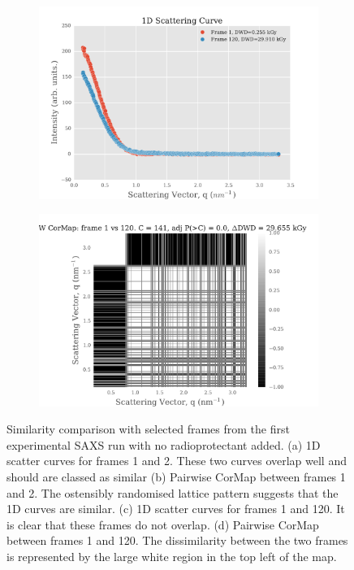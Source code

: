 \begin{figure}
\begin{subfigure}[b]{0.45\textwidth}
            \includegraphics[width=\textwidth]{figures/saxs/scatter_curve_frames_1_120.pdf}
            \caption{}
            \label{fig:1D scatter plot of frames 1 and 120}
    \end{subfigure}
    \qquad
    \begin{subfigure}[b]{0.45\textwidth}
            \centering
            \includegraphics[width=\textwidth]{figures/saxs/pwcormap_frames_1_120.pdf}
            \caption{}
            \label{fig:Pairwise correlation frames 1 and 120}
    \end{subfigure}
    \caption{Similarity comparison with selected frames from the first experimental SAXS run with no radioprotectant added. (a) 1D scatter curves for frames 1 and 2. These two curves overlap well and should are classed as similar (b) Pairwise CorMap between frames 1 and 2. The ostensibly randomised lattice pattern suggests that the 1D curves are similar. (c) 1D scatter curves for frames 1 and 120. It is clear that these frames do not overlap. (d) Pairwise CorMap between frames 1 and 120. The dissimilarity between the two frames is represented by the large white region in the top left of the map.}
    \label{fig:Pairwise correlation plots}
\end{figure}
